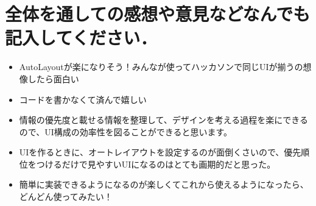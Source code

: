\section{全体を通しての感想や意見などなんでも記入してください．}
\begin{itemize}
	\item AutoLayoutが楽になりそう！みんなが使ってハッカソンで同じUIが揃うの想像したら面白い
	\item コードを書かなくて済んで嬉しい
	\item 情報の優先度と載せる情報を整理して、デザインを考える過程を楽にできるので、UI構成の効率性を図ることができると思います。
	\item UIを作るときに、オートレイアウトを設定するのが面倒くさいので、優先順位をつけるだけで見やすいUIになるのはとても画期的だと思った。
	\item 簡単に実装できるようになるのが楽しくてこれから使えるようになったら、どんどん使ってみたい！
\end{itemize}